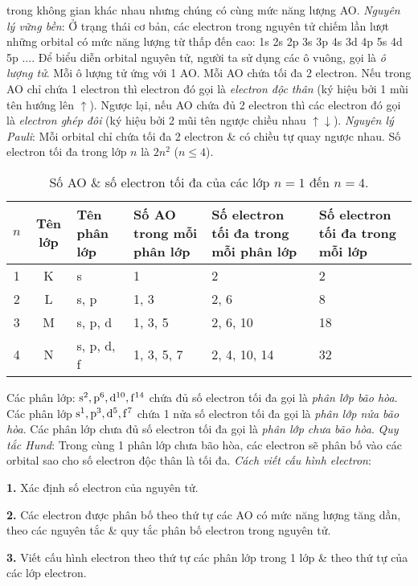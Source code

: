 \documentclass{article}
\numberwithin{equation}{section}
\begin{document}
trong không gian khác nhau nhưng chúng có cùng mức năng lượng AO. \textit{Nguyên lý vững bền}: Ở trạng thái cơ bản, các electron trong nguyên tử chiếm lần lượt những orbital có mức năng lượng từ thấp đến cao: 1s 2s 2p 3s 3p 4s 3d 4p 5s 4d 5p $\ldots$. Để biểu diễn orbital nguyên tử, người ta sử dụng các ô vuông, gọi là \textit{ô lượng tử}. Mỗi ô lượng tử ứng với 1 AO. Mỗi AO chứa tối đa 2 electron. Nếu trong AO chỉ chứa 1 electron thì electron đó gọi là \textit{electron độc thân} (ký hiệu bởi 1 mũi tên hướng lên $\uparrow$). Ngược lại, nếu AO chứa đủ 2 electron thì các electron đó gọi là \textit{electron ghép đôi} (ký hiệu bởi 2 mũi tên ngược chiều nhau $\uparrow\downarrow$). \textit{Nguyên lý Pauli}: Mỗi orbital chỉ chứa tối đa 2 electron \& có chiều tự quay ngược nhau. Số electron tối đa trong lớp $n$ là $2n^2$ ($n\le 4$).
\begin{table}[h]
	\centering
	\begin{tabular}{|c|c|l|p{2.5cm}|p{4cm}|p{3cm}|}
		\hline
		$n$ & \textbf{Tên lớp} & \textbf{Tên phân lớp} & \textbf{Số AO trong mỗi phân lớp} & \textbf{Số electron tối đa trong mỗi phân lớp} & \textbf{Số electron tối đa trong mỗi lớp} \\
		\hline
		1 & K & s & 1 & 2 & 2 \\
		\hline
		2 & L & s, p & 1, 3 & 2, 6 & 8 \\
		\hline
		3 & M & s, p, d & 1, 3, 5 & 2, 6, 10 & 18 \\
		\hline
		4 & N & s, p, d, f & 1, 3, 5, 7 & 2, 4, 10, 14 & 32 \\
		\hline
	\end{tabular}
	\caption{Số AO \& số electron tối đa của các lớp $n = 1$ đến $n = 4$.}
\end{table}
Các phân lớp: $\rm s^2,p^6,d^{10},f^{14}$ chứa đủ số electron tối đa gọi là \textit{phân lớp bão hòa}. Các phân lớp $\rm s^1,p^3,d^5,f^7$ chứa 1 nửa số electron tối đa gọi là \textit{phân lớp nửa bão hòa}. Các phân lớp chưa đủ số electron tối đa gọi là \textit{phân lớp chưa bão hòa}. \textit{Quy tắc Hund}: Trong cùng 1 phân lớp chưa bão hòa, các electron sẽ phân bố vào các orbital sao cho số electron độc thân là tối đa. \textit{Cách viết cấu hình electron}:
\begin{enumerate*}
	\item[\textbf{1.}] Xác định số electron của nguyên tử.
	\item[\textbf{2.}] Các electron được phân bố theo thứ tự các AO có mức năng lượng tăng dần, theo các nguyên tắc \& quy tắc phân bố electron trong nguyên tử.
	\item[\textbf{3.}] Viết cấu hình electron theo thứ tự các phân lớp trong 1 lớp \& theo thứ tự của các lớp electron.
\end{enumerate*}
\end{document}
